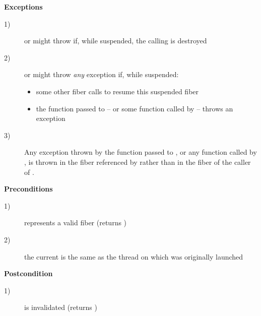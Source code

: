 {\bfseries Exceptions}
\begin{description}
    \item[1)] \resume or \resumewith might throw \unwindex if, while suspended,
              the calling \fiber is destroyed
    \item[2)] \resume or \resumewith might throw \emph{any} exception if,
              while suspended:
              \begin{itemize}
                  \item some other fiber calls \resumewith to resume this
                        suspended fiber
                  \item the function  passed to \resumewith -- or some
                        function called by  -- throws an exception
              \end{itemize}
    \item[3)] Any exception thrown by the function  passed to
              \resumewith, or any function called by , is thrown in the
              fiber referenced by  rather than in the fiber of
              the caller of \resumewith.
\end{description}

{\bfseries Preconditions}
\begin{description}
    \item[1)]  represents a valid fiber (\opbool returns )
    \item[2)] the current  is the same as the thread on which
               was originally launched
\end{description}

{\bfseries Postcondition}
\begin{description}
    \item[1)]  is invalidated (\opbool returns )
\end{description}

